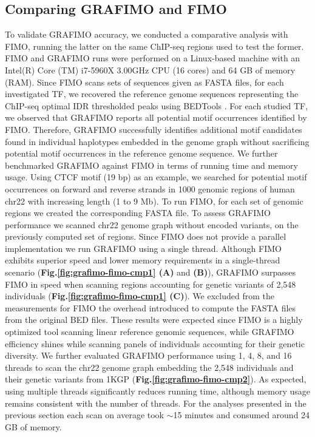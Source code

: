\documentclass[a4paper, titlepage, openright]{book}
\newcommand{\grafimo}{GRAFIMO\xspace}
\begin{document}
\subsection{Comparing \grafimo and FIMO}
To validate \grafimo accuracy, we conducted a comparative analysis with FIMO, running the latter on the same ChIP-seq regions used to test the former. FIMO and \grafimo runs were performed on a Linux-based machine with an Intel(R) Core (TM) i7-5960X 3.00GHz CPU (16 cores) and 64 GB of memory (RAM). Since FIMO scans sets of sequences given as FASTA files, for each investigated TF, we recovered the reference genome sequences representing the ChIP-seq optimal IDR thresholded peaks using BEDTools \citep{quinlan2010bedtools}. For each studied TF, we observed that \grafimo reports all potential motif occurrences identified by FIMO. Therefore, \grafimo successfully identifies additional motif candidates found in individual haplotypes embedded in the genome graph without sacrificing potential motif occurrences in the reference genome sequence. We further benchmarked \grafimo against FIMO in terms of running time and memory usage. Using CTCF motif (19 bp) as an example, we searched for potential motif occurrences on forward and reverse strands in 1000 genomic regions of human chr22 with increasing length (1 to 9 Mb). To run FIMO, for each set of genomic regions we created the corresponding FASTA file. To assess \grafimo performance we scanned chr22 genome graph without encoded variants, on the previously computed set of regions. Since FIMO does not provide a parallel implementation we run \grafimo using a single thread. Although FIMO exhibits superior speed and lower memory requirements in a single-thread scenario (\textbf{Fig.\ref{fig:grafimo-fimo-cmp1} (A)} and \textbf{(B)}), \grafimo surpasses FIMO in speed when scanning regions accounting for genetic variants of 2,548 individuals (\textbf{Fig.\ref{fig:grafimo-fimo-cmp1} (C)}). We excluded from the measurements for FIMO the overhead introduced to compute the FASTA files from the original BED files. These results were expected since FIMO is a highly optimized tool scanning linear reference genomic sequences, while \grafimo efficiency shines while scanning panels of individuals accounting for their genetic diversity. We further evaluated \grafimo performance using 1, 4, 8, and 16 threads to scan the chr22 genome graph embedding the 2,548 individuals and their genetic variants from 1KGP (\textbf{Fig.\ref{fig:grafimo-fimo-cmp2}}). As expected, using multiple threads significantly reduces running time, although memory usage remains consistent with the number of threads. For the analyses presented in the previous section each scan on average took $\sim$15 minutes and consumed around 24 GB of memory. 
\end{document}
